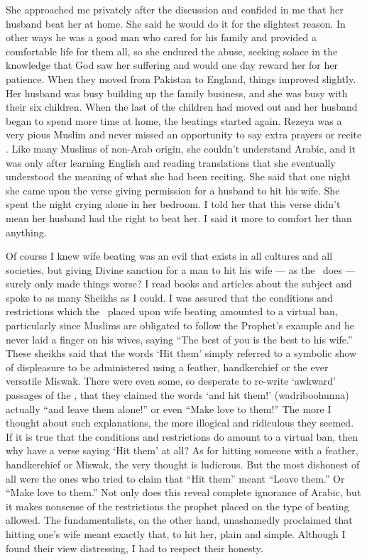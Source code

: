 \documentclass[12pt]{memoir}
\begin{document}
She approached me privately after the discussion
and confided in me that her husband beat her at home.
She said he would do it for the slightest reason.
In other ways he was a good man who cared for his family
and provided a comfortable life for them all, so she endured the abuse,
seeking solace in the knowledge that God saw her suffering
and would one day reward her for her patience.
When they moved from Pakistan to England, things improved slightly.
Her husband was busy building up the family business,
and she was busy with their six children.
When the last of the children had moved out
and her husband began to spend more time at home,
the beatings started again.
Rezeya was a very pious Muslim and never missed an opportunity
to say extra prayers or recite \Quran.
Like many Muslims of non-Arab origin, she couldn’t understand Arabic,
and it was only after learning English and reading translations
that she eventually understood the meaning of what she had been reciting.
She said that one night she came upon the verse
giving permission for a husband to hit his wife.
She spent the night crying alone in her bedroom.
I told her that this verse didn’t mean her husband had the right to beat her.
I said it more to comfort her than anything.

Of course I knew wife beating was an evil that exists in all cultures
and all societies, but giving Divine sanction for a man to hit his wife —
as the \Quran\ does — surely only made things worse?
I read books and articles about the subject
and spoke to as many Sheikhs as I could.
I was assured that the conditions and restrictions
which the \Quran\ placed upon wife beating amounted to a virtual ban,
particularly since Muslims are obligated to follow the Prophet’s example
and he never laid a finger on his wives\footnotemark,
saying “The best of you is the best to his wife.”
These sheikhs said that the words ‘Hit them’ simply referred
to a symbolic show of displeasure to be administered
using a feather, handkerchief or the ever versatile Miswak.
There were even some, so desperate to re-write
‘awkward’ passages of the \Quran,
that they claimed the words ‘and hit them!’ (wadriboohunna)
actually  “and leave them alone!” or even “Make love to them!”
The more I thought about such explanations,
the more illogical and ridiculous they seemed.
If it is true that the conditions and restrictions do amount to a virtual ban,
then why have a verse saying ‘Hit them’ at all?
As for hitting someone with a feather, handkerchief or Miswak,
the very thought is ludicrous.
But the most dishonest of all were the ones who tried to claim
that “Hit them” meant “Leave them.”
Or “Make love to them.”
Not only does this reveal complete ignorance of Arabic,
but it makes nonsense of the restrictions the prophet
placed on the type of beating allowed.
The fundamentalists, on the other hand, unashamedly proclaimed
that hitting one’s wife meant exactly that, to hit her, plain and simple.
Although I found their view distressing, I had to respect their honesty.
\end{document}
